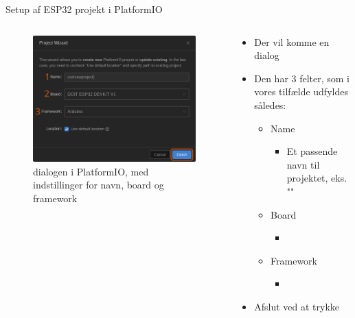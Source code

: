 \documentclass[aspectratio=169]{beamer}
\begin{document}
\begin{frame}{Setup af ESP32 projekt i PlatformIO}
\begin{columns}
	\begin{column}{0.5\textwidth}
		\begin{figure}
  			\includegraphics[height=0.7\textheight,keepaspectratio=true]{assets/pictures/pio-project-2.png}
  			\caption{ dialogen i PlatformIO, med indstillinger for navn, board og framework}
  			\label{fig:pio-project2}
		\end{figure}
	\end{column}
	\begin{column}{0.5\textwidth}
		\begin{textBox}
			\begin{itemize}
				\item Der vil komme en  dialog
				\item Den har 3 felter, som i vores tilfælde udfyldes således:
				\begin{itemize}
					\item Name
					\begin{itemize}
						\item Et passende navn til projektet, eks. ""
					\end{itemize}
					\item Board
					\begin{itemize}
						\item  {}
					\end{itemize}
					\item Framework
					\begin{itemize}
						\item {}
					\end{itemize}
				\end{itemize}
				\item Afslut ved at trykke 
			\end{itemize}
		\end{textBox}
	\end{column}
\end{columns}
\end{frame}
\end{document}
